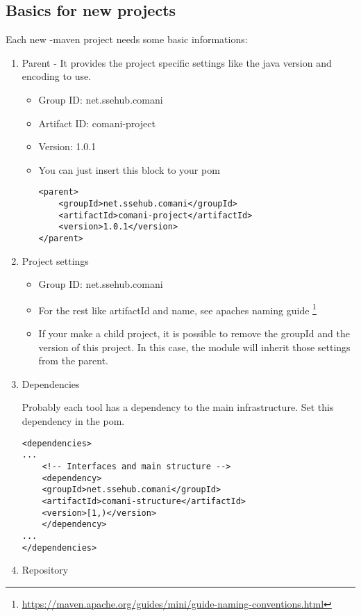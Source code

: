 \subsection{Basics for new projects} \label{chapter:maven_basics}
Each new \thetool{}-maven project needs some basic informations:

\begin{enumerate}
	\item Parent - It provides the project specific settings like the java version and encoding to use. 
		\begin{itemize}
			\item Group ID: net.ssehub.comani
			\item Artifact ID: comani-project
			\item Version: 1.0.1 
			\item You can just insert this block to your pom
			\begin{lstlisting}
<parent>
	<groupId>net.ssehub.comani</groupId>
	<artifactId>comani-project</artifactId>
	<version>1.0.1</version>
</parent>
			\end{lstlisting}
		\end{itemize}
	\item Project settings
		\begin{itemize}
			\item Group ID: net.ssehub.comani
			\item For the rest like artifactId and name, see apaches naming guide \footnote{\url{https://maven.apache.org/guides/mini/guide-naming-conventions.html}}
			
			\item {} If your make a child project, it is possible to remove the groupId and the version of this project. In this case, the module will inherit those settings from the parent.
		\end{itemize}
	\item Dependencies
	
		Probably each \thetool{} tool has a dependency to the main infrastructure.
		Set this dependency in the pom. 
		\begin{lstlisting}
<dependencies>
...
	<!-- Interfaces and main structure -->
	<dependency>
	<groupId>net.ssehub.comani</groupId>
	<artifactId>comani-structure</artifactId>
	<version>[1,)</version>
	</dependency>
...
</dependencies>
		\end{lstlisting}
	\item Repository
	

\end{enumerate}
